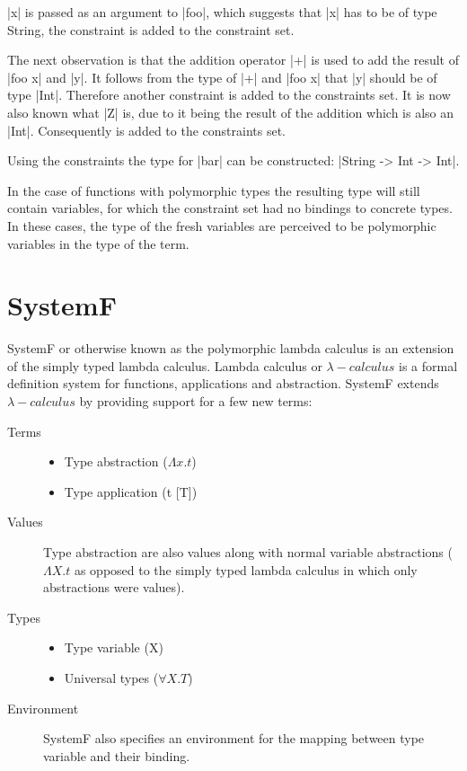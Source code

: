 |x| is passed as an argument to |foo|, which suggests that |x| has to be of type String, the constraint  is added to the constraint set.

The next observation is that the addition operator |+| is used to add the result of |foo x| and |y|. It follows from the type of |+| and |foo x| that |y| should be of type |Int|. Therefore another constraint  is added to the constraints set. It is now also known what |Z| is, due to it being the result of the addition which is also an |Int|. Consequently  is added to the constraints set.

Using the constraints {} the type for |bar| can be constructed: |String -> Int -> Int|.

In the case of functions with polymorphic types the resulting type will still contain variables, for which the constraint set had no bindings to concrete types. In these cases, the type of the fresh variables are perceived to be polymorphic variables in the type of the term.

\section{SystemF}
SystemF or otherwise known as the polymorphic lambda calculus is an extension of the simply typed lambda calculus. Lambda calculus or $\lambda-calculus$  is a formal definition system for functions, applications and abstraction. SystemF extends $\lambda-calculus$ by providing support for a few new terms:

\begin{description}
\item[Terms]{
	\begin{minipage}[t]{\linewidth}
		\begin{itemize}
			\item Type abstraction ($\Lambda x.t$)
			\item Type application (t [T])
		\end{itemize}
	\end{minipage}
}
\item[Values] Type abstraction are also values along with normal variable abstractions ($\Lambda X.t$ as opposed to the simply typed lambda calculus in which only abstractions were values).
\item[Types]{ 
	\begin{minipage}[t]{\linewidth}
		\begin{itemize}
			\item Type variable (X)
			\item Universal types ($\forall X. T$)
		\end{itemize}
	\end{minipage}
}
\item[Environment] SystemF also specifies an environment for the mapping between type variable and their binding.
\end{description}

